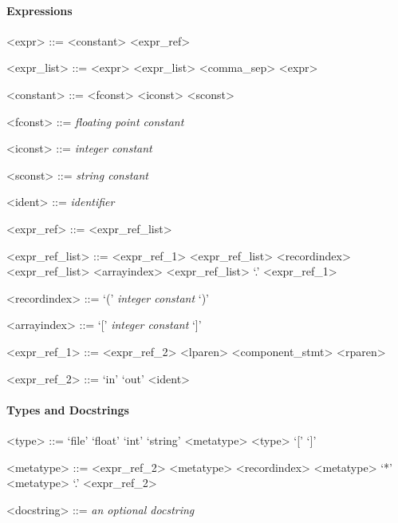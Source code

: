 \paragraph{Expressions}

\begin{grammar}
  <expr> ::= <constant>
  \alt <expr_ref>

  <expr_list> ::= <expr>
  \alt <expr_list> <comma_sep> <expr>

  <constant> ::= <fconst>
  \alt <iconst>
  \alt <sconst>

  <fconst> ::= \emph{floating point constant}

  <iconst> ::= \emph{integer constant}

  <sconst> ::= \emph{string constant}

  <ident> ::= \emph{identifier}


  <expr_ref> ::= <expr_ref_list>

  <expr_ref_list> ::= <expr_ref_1>
  \alt <expr_ref_list> <recordindex>
  \alt <expr_ref_list> <arrayindex>
  \alt <expr_ref_list> `.' <expr_ref_1>

  <recordindex> ::= `(' \emph{integer constant} `)'

  <arrayindex> ::= `[' \emph{integer constant} `]'

  <expr_ref_1> ::= <expr_ref_2>
  \alt <lparen> <component_stmt> <rparen>

  <expr_ref_2> ::= `in'
  \alt `out'
  \alt <ident>
\end{grammar}


\paragraph{Types and Docstrings}

\begin{grammar}
  <type> ::= `file'
  \alt `float'
  \alt `int'
  \alt `string'
  \alt <metatype>
  \alt <type> `[' `]'

  <metatype> ::= <expr_ref_2>
  \alt <metatype> <recordindex>
  \alt <metatype> `*'
  \alt <metatype> `.' <expr_ref_2>

  <docstring> ::= \emph{an optional docstring}
\end{grammar}



